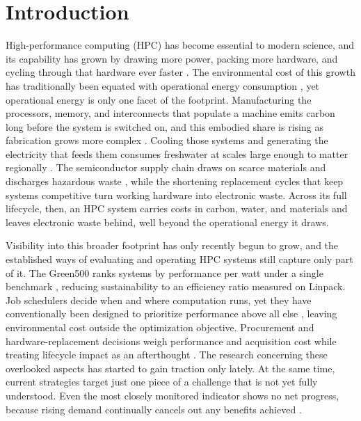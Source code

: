 \chapter{Introduction}
\label{ch:introduction}

High-performance computing (HPC) has become essential to modern science, and its capability has grown by drawing more power, packing more hardware, and cycling through that hardware ever faster \parencite{portegieszwart2020Ecological, allen2022Huge}. The environmental cost of this growth has traditionally been equated with operational energy consumption \parencite{koomey2011Implications}, yet operational energy is only one facet of the footprint. Manufacturing the processors, memory, and interconnects that populate a machine emits carbon long before the system is switched on, and this embodied share is rising as fabrication grows more complex \parencite{gupta2021Chasing, pirson2023Environmental}. Cooling those systems and generating the electricity that feeds them consumes freshwater at scales large enough to matter regionally \parencite{mytton2021Data}. The semiconductor supply chain draws on scarce materials and discharges hazardous waste \parencite{sandhu2025Semiconductor}, while the shortening replacement cycles that keep systems competitive turn working hardware into electronic waste. Across its full lifecycle, then, an HPC system carries costs in carbon, water, and materials and leaves electronic waste behind, well beyond the operational energy it draws.

Visibility into this broader footprint has only recently begun to grow, and the established ways of evaluating and operating HPC systems still capture only part of it. The Green500 ranks systems by performance per watt under a single benchmark \parencite{feng2007Green500}, reducing sustainability to an efficiency ratio measured on Linpack. Job schedulers decide when and where computation runs, yet they have conventionally been designed to prioritize performance above all else \parencite{kocot2023EnergyAware, czarnul2019EnergyAware}, leaving environmental cost outside the optimization objective. Procurement and hardware-replacement decisions weigh performance and acquisition cost while treating lifecycle impact as an afterthought \parencite{li2023Sustainable}. The research concerning these overlooked aspects has started to gain traction only lately. At the same time, current strategies target just one piece of a challenge that is not yet fully understood. Even the most closely monitored indicator shows no net progress, because rising demand continually cancels out any benefits achieved \parencite{york2022Rebound}.

